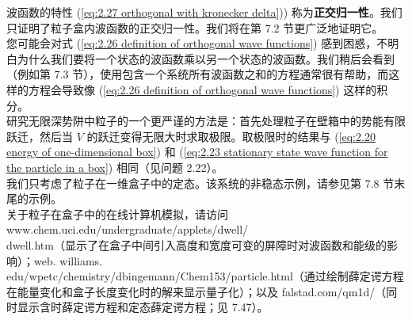 	波函数的特性 (\ref{eq:2.27 orthogonal with kronecker delta})) 称为\textbf{正交归一性}。我们只证明了粒子盒内波函数的正交归一性。我们将在第 7.2 节更广泛地证明它。\\
	\indent 您可能会对式 (\ref{eq:2.26 definition of orthogonal wave functions}) 感到困惑，不明白为什么我们要将一个状态的波函数乘以另一个状态的波函数。我们稍后会看到（例如第 7.3 节），使用包含一个系统所有波函数之和的方程通常很有帮助，而这样的方程会导致像 (\ref{eq:2.26 definition of orthogonal wave functions}) 这样的积分。\\
	\indent 研究无限深势阱中粒子的一个更严谨的方法是：首先处理粒子在壁箱中的势能有限跃迁，然后当 $V$ 的跃迁变得无限大时求取极限。取极限时的结果与 (\ref{eq:2.20 energy of one-dimensional box}) 和 (\ref{eq:2.23 stationary state wave function for the particle in a box}) 相同（见问题 2.22）。\\
	\indent 我们只考虑了粒子在一维盒子中的定态。该系统的非稳态示例，请参见第 7.8 节末尾的示例。\\
	\indent 关于粒子在盒子中的在线计算机模拟，请访问 www.chem.uci.edu/undergraduate/applets/dwell/\\dwell.htm（显示了在盒子中间引入高度和宽度可变的屏障时对波函数和能级的影响）；web. williams.\\edu/wpetc/chemistry/dbingemann/Chem153/particle.html（通过绘制薛定谔方程在能量变化和盒子长度变化时的解来显示量子化）；以及 falstad.com/qm1d/（同时显示含时薛定谔方程和定态薛定谔方程；见 7.47）。

